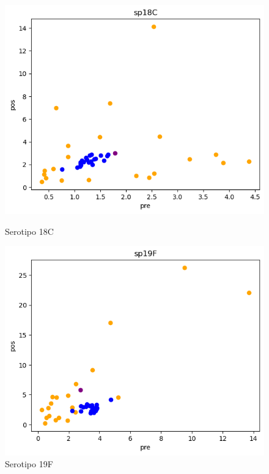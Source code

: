 \begin{figure}
    
    \begin{minipage}{0.45\textwidth}
        \centering
        \includegraphics[width=\linewidth]{Graphics/sp18ct.png}
        \caption{Serotipo 18C}
        \label{fig:sp18ct}
    \end{minipage}
    \begin{minipage}{0.45\textwidth}
        \centering
        \includegraphics[width=\linewidth]{Graphics/sp19ft.png}
        \caption{Serotipo 19F}
        \label{fig:sp19ft}
    \end{minipage}
\end{figure}
